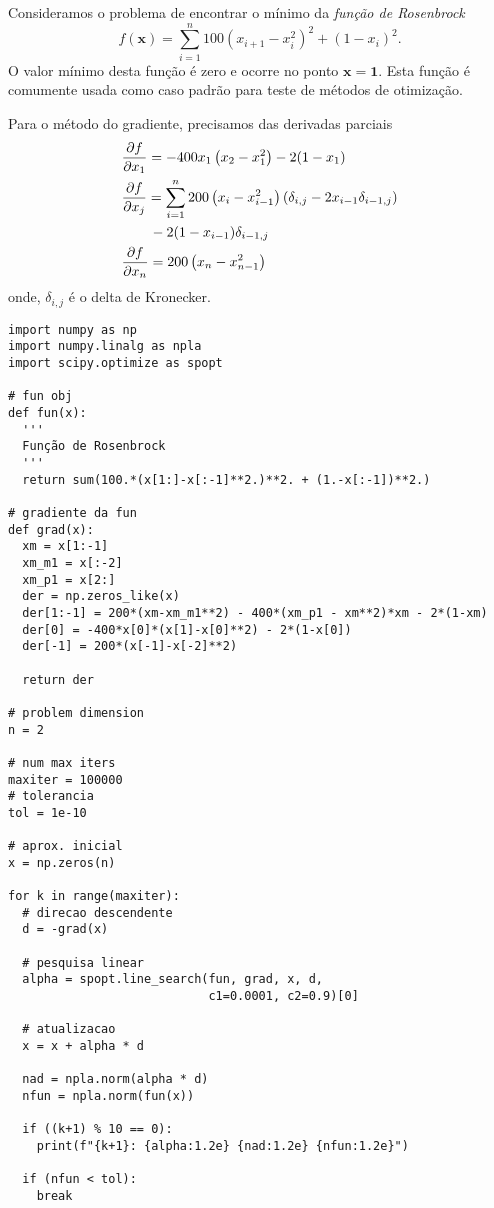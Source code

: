 \begin{ex}\label{ex:Rosenbrock}
  Consideramos o problema de encontrar o mínimo da \emph{função de Rosenbrock}{\rosenbrock}
  \begin{equation}
    f(\pmb{x}) = \sum_{i=1}^n 100\left(x_{i+1}-x_i^2\right)^2 + (1-x_i)^2.
  \end{equation}
  O valor mínimo desta função é zero e ocorre no ponto $\pmb{x} = \pmb{1}$. Esta função é comumente usada como caso padrão para teste de métodos de otimização.

  Para o método do gradiente, precisamos das derivadas parciais
  \begin{align}
    & \frac{\partial f}{\partial x_1} = -400x_1\left(x_2-x_1^2\right) - 2(1-x_1) \\
    &  \frac{\partial f}{\partial x_j} = \sum_{i=1}^n 200\left(x_i-x_{i-1}^2\right)(\delta_{i,j} - 2x_{i-1}\delta_{i-1,j}) \nonumber\\
    &\qquad - 2(1-x_{i-1})\delta_{i-1,j} \\
    & \frac{\partial f}{\partial x_{n}} = 200\left(x_n - x_{n-1}^2\right)
  \end{align}
  onde, $\delta_{i,j}$ é o delta de Kronecker{\kronecker}.


\begin{lstlisting}[caption=Algoritmo do Gradiente, label={lst:algOtimMG}]
import numpy as np
import numpy.linalg as npla
import scipy.optimize as spopt

# fun obj
def fun(x):
  '''
  Função de Rosenbrock
  '''
  return sum(100.*(x[1:]-x[:-1]**2.)**2. + (1.-x[:-1])**2.)

# gradiente da fun
def grad(x):
  xm = x[1:-1]
  xm_m1 = x[:-2]
  xm_p1 = x[2:]
  der = np.zeros_like(x)
  der[1:-1] = 200*(xm-xm_m1**2) - 400*(xm_p1 - xm**2)*xm - 2*(1-xm)
  der[0] = -400*x[0]*(x[1]-x[0]**2) - 2*(1-x[0])
  der[-1] = 200*(x[-1]-x[-2]**2)
  
  return der

# problem dimension
n = 2

# num max iters
maxiter = 100000
# tolerancia
tol = 1e-10

# aprox. inicial
x = np.zeros(n)

for k in range(maxiter):
  # direcao descendente
  d = -grad(x)

  # pesquisa linear
  alpha = spopt.line_search(fun, grad, x, d, 
                            c1=0.0001, c2=0.9)[0]

  # atualizacao
  x = x + alpha * d

  nad = npla.norm(alpha * d)
  nfun = npla.norm(fun(x))

  if ((k+1) % 10 == 0):
    print(f"{k+1}: {alpha:1.2e} {nad:1.2e} {nfun:1.2e}")

  if (nfun < tol):
    break
\end{lstlisting}

\end{ex}

